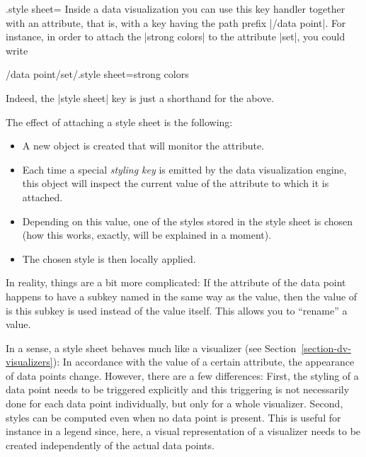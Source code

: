 \begin{handler}{{.style sheet}=}
    Inside a data visualization you can use this key handler together with an
    attribute, that is, with a key having the path prefix |/data point|. For
    instance, in order to attach the  |strong colors| to the
    attribute |set|, you could write
\begin{codeexample}
/data point/set/.style sheet=strong colors
\end{codeexample}
    Indeed, the |style sheet| key is just a shorthand for the above.

    The effect of attaching a style sheet is the following:
    \begin{itemize}
        \item A new object is created that will monitor the attribute.
        \item Each time a special \emph{styling key} is emitted by the data
            visualization engine, this object will inspect the current value of
            the attribute to which it is attached.
        \item Depending on this value, one of the styles stored in the style
            sheet is chosen (how this works, exactly, will be explained in a
            moment).
        \item The chosen style is then locally applied.
    \end{itemize}

    In reality, things are a bit more complicated: If the attribute of the data
    point happens to have a subkey named in the same way as the value, then the
    value of is this subkey is used instead of the value itself. This allows
    you to ``rename'' a value.

    In a sense, a style sheet behaves much like a visualizer (see
    Section~\ref{section-dv-visualizers}): In accordance with the value of a
    certain attribute, the appearance of data points change. However, there are
    a few differences: First, the styling of a data point needs to be triggered
    explicitly and this triggering is not necessarily done for each data point
    individually, but only for a whole visualizer. Second, styles can be
    computed even when no data point is present. This is useful for instance in
    a legend since, here, a visual representation of a visualizer needs to be
    created independently of the actual data points.
\end{handler}


